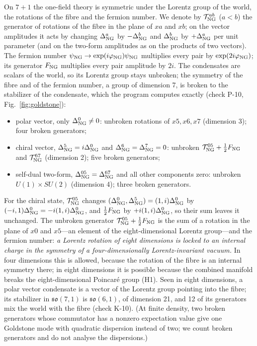 On $7+1$ the one-field theory is symmetric under the Lorentz group of the world, the rotations of the
fibre and the fermion number. We denote by $\mathcal T^{ab}_{\rm NG}$ ($a<b$) the generator of rotations of
the fibre in the plane of $xa$ and $xb$; on the vector amplitudes it acts by changing $\Delta^a_{\rm NG}$ by
$-\Delta^b_{\rm NG}$ and $\Delta^b_{\rm NG}$ by $+\Delta^a_{\rm NG}$ per unit parameter (and on the two-form
amplitudes as on the products of two vectors). The fermion number $\psi_{\rm NG}\to\exp(i\varphi_{\rm NG})
\psi_{\rm NG}$ multiplies every pair by $\exp(2i\varphi_{\rm NG})$; its generator $F_{\rm NG}$ multiplies every
pair amplitude by $2i$. The condensates are scalars of the world, so its Lorentz group stays unbroken;
the symmetry of the fibre and of the fermion number, a group of dimension 7, is broken to the stabilizer
of the condensate, which the program computes exactly (check P-10, Fig.~\ref{fig:goldstone}):
\begin{itemize}
\item polar vector, only $\Delta^0_{\rm NG}\neq0$: unbroken rotations of $x5,x6,x7$ (dimension 3); four
broken generators;
\item chiral vector, $\Delta^5_{\rm NG}=i\Delta^0_{\rm NG}$ and $\Delta^6_{\rm NG}=\Delta^7_{\rm NG}=0$: unbroken
$\mathcal T^{05}_{\rm NG}+\tfrac12F_{\rm NG}$ and $\mathcal T^{67}_{\rm NG}$ (dimension 2); five broken generators;
\item self-dual two-form, $\Delta^{05}_{\rm NG}=\Delta^{67}_{\rm NG}$ and all other components zero: unbroken
$U(1)\times SU(2)$ (dimension 4); three broken generators.
\end{itemize}
For the chiral state, $\mathcal T^{05}_{\rm NG}$ changes $(\Delta^0_{\rm NG},\Delta^5_{\rm NG})=(1,i)\Delta^0_{\rm NG}$
by $(-i,1)\Delta^0_{\rm NG}=-i(1,i)\Delta^0_{\rm NG}$, and $\tfrac12F_{\rm NG}$ by $+i(1,i)\Delta^0_{\rm NG}$, so their
sum leaves it unchanged. The unbroken generator $\mathcal T^{05}_{\rm NG}+\tfrac12F_{\rm NG}$ is the sum of a
rotation in the plane of $x0$ and $x5$---an element of the eight-dimensional Lorentz group---and the
fermion number: \emph{a Lorentz rotation of eight dimensions is locked to an internal charge in the
symmetry of a four-dimensionally Lorentz-invariant vacuum.} In four dimensions this is allowed, because
the rotation of the fibre is an internal symmetry there; in eight dimensions it is possible because the
combined manifold breaks the eight-dimensional Poincar\'e group (H1). Seen in eight dimensions, a polar
vector condensate is a vector of the Lorentz group pointing into the fibre; its stabilizer in
$\mathfrak{so}(7,1)$ is $\mathfrak{so}(6,1)$, of dimension 21, and 12 of its generators mix the world with
the fibre (check K-10). (At finite density, two broken generators whose commutator has a nonzero
expectation value give one Goldstone mode with quadratic dispersion instead of two; we count broken
generators and do not analyse the dispersions.)

